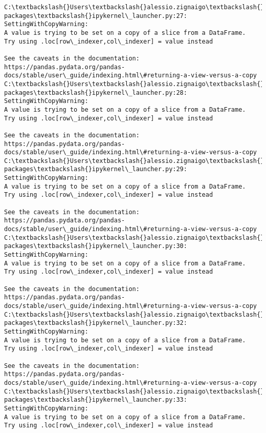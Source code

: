 \documentclass[11pt]{article}
\begin{document}
    \begin{Verbatim}[commandchars=\\\{\}]
C:\textbackslash{}Users\textbackslash{}alessio.zignaigo\textbackslash{}Anaconda3\textbackslash{}lib\textbackslash{}site-packages\textbackslash{}ipykernel\_launcher.py:27:
SettingWithCopyWarning:
A value is trying to be set on a copy of a slice from a DataFrame.
Try using .loc[row\_indexer,col\_indexer] = value instead

See the caveats in the documentation: https://pandas.pydata.org/pandas-
docs/stable/user\_guide/indexing.html\#returning-a-view-versus-a-copy
C:\textbackslash{}Users\textbackslash{}alessio.zignaigo\textbackslash{}Anaconda3\textbackslash{}lib\textbackslash{}site-packages\textbackslash{}ipykernel\_launcher.py:28:
SettingWithCopyWarning:
A value is trying to be set on a copy of a slice from a DataFrame.
Try using .loc[row\_indexer,col\_indexer] = value instead

See the caveats in the documentation: https://pandas.pydata.org/pandas-
docs/stable/user\_guide/indexing.html\#returning-a-view-versus-a-copy
C:\textbackslash{}Users\textbackslash{}alessio.zignaigo\textbackslash{}Anaconda3\textbackslash{}lib\textbackslash{}site-packages\textbackslash{}ipykernel\_launcher.py:29:
SettingWithCopyWarning:
A value is trying to be set on a copy of a slice from a DataFrame.
Try using .loc[row\_indexer,col\_indexer] = value instead

See the caveats in the documentation: https://pandas.pydata.org/pandas-
docs/stable/user\_guide/indexing.html\#returning-a-view-versus-a-copy
C:\textbackslash{}Users\textbackslash{}alessio.zignaigo\textbackslash{}Anaconda3\textbackslash{}lib\textbackslash{}site-packages\textbackslash{}ipykernel\_launcher.py:30:
SettingWithCopyWarning:
A value is trying to be set on a copy of a slice from a DataFrame.
Try using .loc[row\_indexer,col\_indexer] = value instead

See the caveats in the documentation: https://pandas.pydata.org/pandas-
docs/stable/user\_guide/indexing.html\#returning-a-view-versus-a-copy
C:\textbackslash{}Users\textbackslash{}alessio.zignaigo\textbackslash{}Anaconda3\textbackslash{}lib\textbackslash{}site-packages\textbackslash{}ipykernel\_launcher.py:32:
SettingWithCopyWarning:
A value is trying to be set on a copy of a slice from a DataFrame.
Try using .loc[row\_indexer,col\_indexer] = value instead

See the caveats in the documentation: https://pandas.pydata.org/pandas-
docs/stable/user\_guide/indexing.html\#returning-a-view-versus-a-copy
C:\textbackslash{}Users\textbackslash{}alessio.zignaigo\textbackslash{}Anaconda3\textbackslash{}lib\textbackslash{}site-packages\textbackslash{}ipykernel\_launcher.py:33:
SettingWithCopyWarning:
A value is trying to be set on a copy of a slice from a DataFrame.
Try using .loc[row\_indexer,col\_indexer] = value instead


\end{Verbatim}
\end{document}
